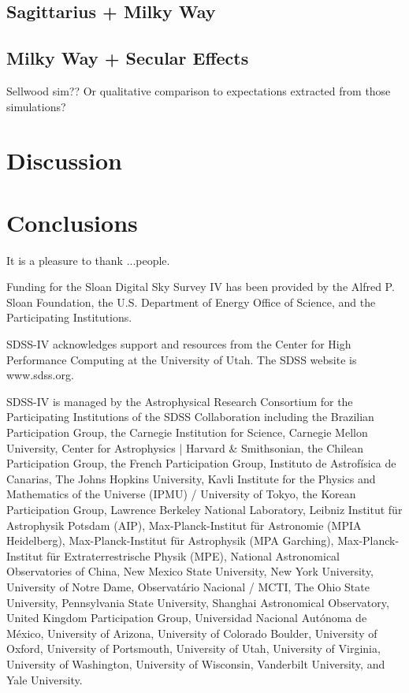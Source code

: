 \documentclass[modern]{aastex63}
\begin{document}
\subsection{Sagittarius + Milky Way}
\label{sec:sag-only}

\subsection{Milky Way + Secular Effects}
\label{sec:mw-secular}

Sellwood sim?? Or qualitative comparison to expectations extracted from those simulations?


\section{Discussion}
\label{sec:discussion}



\section{Conclusions}
\label{sec:conclusions}



\acknowledgments
It is a pleasure to thank
  ...people.

Funding for the Sloan Digital Sky
Survey IV has been provided by the
Alfred P. Sloan Foundation, the U.S.
Department of Energy Office of
Science, and the Participating
Institutions.

SDSS-IV acknowledges support and
resources from the Center for High
Performance Computing  at the
University of Utah. The SDSS
website is www.sdss.org.

SDSS-IV is managed by the
Astrophysical Research Consortium
for the Participating Institutions
of the SDSS Collaboration including
the Brazilian Participation Group,
the Carnegie Institution for Science,
Carnegie Mellon University, Center for
Astrophysics | Harvard \&
Smithsonian, the Chilean Participation
Group, the French Participation Group,
Instituto de Astrof\'isica de
Canarias, The Johns Hopkins
University, Kavli Institute for the
Physics and Mathematics of the
Universe (IPMU) / University of
Tokyo, the Korean Participation Group,
Lawrence Berkeley National Laboratory,
Leibniz Institut f\"ur Astrophysik
Potsdam (AIP),  Max-Planck-Institut
f\"ur Astronomie (MPIA Heidelberg),
Max-Planck-Institut f\"ur
Astrophysik (MPA Garching),
Max-Planck-Institut f\"ur
Extraterrestrische Physik (MPE),
National Astronomical Observatories of
China, New Mexico State University,
New York University, University of
Notre Dame, Observat\'ario
Nacional / MCTI, The Ohio State
University, Pennsylvania State
University, Shanghai
Astronomical Observatory, United
Kingdom Participation Group,
Universidad Nacional Aut\'onoma
de M\'exico, University of Arizona,
University of Colorado Boulder,
University of Oxford, University of
Portsmouth, University of Utah,
University of Virginia, University
of Washington, University of
Wisconsin, Vanderbilt University,
and Yale University.
\end{document}
